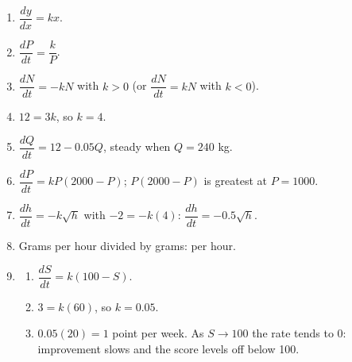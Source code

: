 \documentclass[11pt]{article}
\begin{document}
\newpage
\begin{solbox}
\begin{enumerate}[leftmargin=*,itemsep=4pt]
  \item $\dfrac{dy}{dx}=kx$.
  \item $\dfrac{dP}{dt}=\dfrac kP$.
  \item $\dfrac{dN}{dt}=-kN$ with $k>0$ (or $\dfrac{dN}{dt}=kN$ with $k<0$).
  \item $12=3k$, so $k=4$.
  \item $\dfrac{dQ}{dt}=12-0.05Q$, steady when $Q=240$ kg.
  \item $\dfrac{dP}{dt}=kP(2000-P)$; $P(2000-P)$ is greatest at $P=1000$.
  \item $\dfrac{dh}{dt}=-k\sqrt h$ with $-2=-k(4)$: $\dfrac{dh}{dt}=-0.5\sqrt h$.
  \item Grams per hour divided by grams: per hour.
  \item \begin{enumerate}[label=(\alph*),leftmargin=*,itemsep=3pt]
    \item $\dfrac{dS}{dt}=k(100-S)$.
    \item $3=k(60)$, so $k=0.05$.
    \item $0.05(20)=1$ point per week. As $S\to100$ the rate tends to 0: improvement slows and the score levels off below 100.
  \end{enumerate}
\end{enumerate}
\end{solbox}
\end{document}
